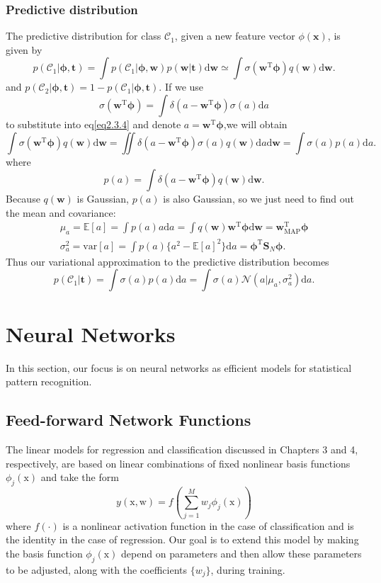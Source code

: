 \documentclass[a4paper]{book}
\newcommand{\normD}{\mathcal{N}}
\newcommand{\mrm}{\mathrm}
\newcommand{\mbf}{\mathbf}
\newcommand{\mcal}{\mathcal}
\newcommand{\ud}{\mathrm{d}}
\newcommand{\ww}{\mbf w}
\newcommand{\ttt}{\mbf t}
\newcommand{\xx}{\mbf x}
\newcommand{\bphi}{\bm{\phi}}
\newcommand{\Exp}{\mathbb{E}}
\newcommand{\cat}{\mcal C}
\newcommand{\trans}{^{\mrm T}}
\begin{document}
\subsubsection*{Predictive distribution}
The predictive distribution for class $\cat_1$, given a new feature vector $\phi(\xx)$, is given by
\begin{equation}\label{eq2.3.4}
  p(\cat_1|\bm \phi,\ttt) = \int p(\cat_1|\bm \phi,\ww)p(\ww|\ttt)\ud \ww\simeq\int\sigma(\ww\trans\bphi)q(\ww)\ud\ww.
\end{equation}
and $p(\cat_2|\bphi, \ttt)=1-p(\cat_1|\bphi, \ttt)$.
If we use
\begin{equation}\label{}
  \sigma(\ww\trans\bphi)=\int \delta(a-\ww\trans\bphi)\sigma(a)\ud a
\end{equation}
to substitute into eq\ref{eq2.3.4} and denote $a = \ww\trans\bphi$,we will obtain
\begin{equation}\label{}
  \int \sigma(\ww\trans\bphi)q(\ww)\ud \ww=\iint\delta(a-\ww\trans\bphi)\sigma(a)q(\ww)\ud a\ud\ww = \int \sigma(a)p(a)\ud a.
\end{equation}
where
\begin{equation}\label{}
  p(a) = \int \delta(a-\ww\trans\bphi)q(\ww)\ud\ww.
\end{equation}
Because $q(\ww)$ is Gaussian, $p(a)$ is also Gaussian, so we just need to find out the mean and covariance:
\begin{gather}\label{}
  \mu_a=\Exp[a] = \int p(a)a\ud a =\int q(\ww)\ww\trans\bphi\ud \ww =\ww_{\mrm{MAP}}\trans\bphi\\
  \sigma_a^2=\mrm{var}[a] = \int p(a)\{a^2-\Exp[a]^2\}\ud a = \bphi\trans\mbf S_N\bphi.
\end{gather}
Thus our variational approximation to the predictive distribution becomes
\begin{equation}\label{}
  p(\cat_1|\ttt) = \int \sigma(a)p(a)\ud a=\int \sigma(a)\normD(a|\mu_a,\sigma_a^2)\ud a.
\end{equation}



\section{Neural Networks}
In this section, our focus is on neural networks as efficient models for statistical pattern recognition.
\subsection{Feed-forward Network Functions}
The linear models for regression and classification discussed in Chapters 3 and 4, respectively, are based on linear combinations of fixed nonlinear basis functions $\phi_j(\mathrm x)$ and take the form
\begin{equation}\label{eq2.4.1}
  y(\mathrm x,\mathrm w) = f(\sum_{j=1}^Mw_j\phi_j(\mathrm x))
\end{equation}
where $f(\cdot)$ is a nonlinear activation function in the case of classification and is the identity in the case of regression. Our goal is to extend this model by making the basis function $\phi_j(\mathrm x)$ depend on parameters and then allow these parameters to be adjusted, along with the coefficients $\{w_j\}$, during training.
\end{document}
